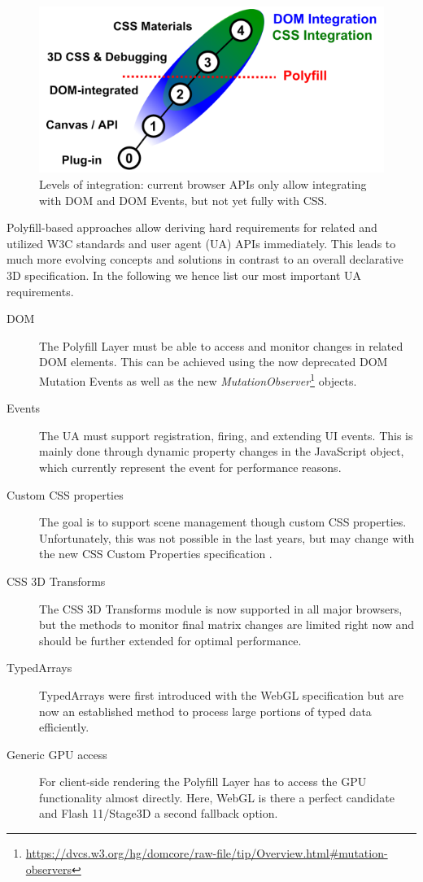 \documentclass{acmsiggraph}
\begin{document}
\begin{figure}
  \centering
  \includegraphics[width=0.9\columnwidth]{images/polyfill.png}
  \caption{Levels of integration: current browser APIs only allow integrating with DOM and DOM Events, but not yet fully with CSS.}
  \label{fig:polyInt}
\end{figure}

Polyfill-based approaches allow deriving hard requirements for related and utilized W3C standards and user agent (UA) APIs immediately. This leads to much more evolving concepts and solutions in contrast to an overall declarative 3D specification. In the following we hence list our most important UA requirements.

\begin{description}
\item[DOM] The Polyfill Layer must be able to access and monitor changes in related DOM elements. This can be achieved using the now deprecated DOM Mutation Events as well as the new \emph{MutationObserver}\footnote{\url{https://dvcs.w3.org/hg/domcore/raw-file/tip/Overview.html\#mutation-observers}} objects.
\item[Events] The UA must support registration, firing, and extending UI events. This is mainly done through dynamic property changes in the JavaScript object, which currently represent the event for performance reasons.
\item[Custom CSS properties] The goal is to support scene management though custom CSS properties. Unfortunately, this was not possible in the last years, but may change with the new CSS Custom Properties specification \cite{CSSCustom}.
\item[CSS 3D Transforms] The CSS 3D Transforms module \cite{webkit3DCSS} is now supported in all major browsers, but the methods to monitor final matrix changes are limited right now and should be further extended for optimal performance.
\item[TypedArrays] TypedArrays \cite{TypArr12} were first introduced with the WebGL specification but are now an established method to process large portions of typed data efficiently.
\item[Generic GPU access] For client-side rendering the Polyfill Layer has to access the GPU functionality almost directly. Here, WebGL is there a perfect candidate and Flash 11/Stage3D a second fallback option.
\end{description}
\end{document}
